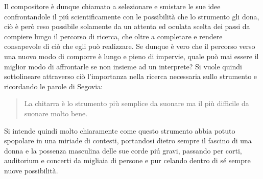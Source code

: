 \documentclass[oneside]{article}
\begin{document}
\begin{multicols*}{2}
Il compositore è dunque chiamato a selezionare e smistare le sue idee confrontandole il piú scientificamente con le possibilità che lo strumento gli dona, ciò è però reso possibile solamente da un attenta ed oculata scelta dei passi da compiere lungo il percorso di ricerca, che oltre a completare e rendere consapevole di ciò che egli può realizzare. Se dunque è vero che il percorso verso una nuovo modo di comporre è lungo e pieno di impervie, quale può mai essere il miglior modo di affrontarle se non insieme ad un interprete? Si vuole quindi sottolineare attraverso ciò l'importanza nella ricerca necessaria sullo strumento e ricordando le parole di Segovia: \begin{quote} La chitarra è lo strumento più semplice da suonare ma il più difficile da suonare molto bene. \end{quote} Si intende quindi molto chiaramente come questo strumento abbia potuto spopolare in una miriade di contesti, portandosi dietro sempre il fascino di una donna e la possenza masculina delle sue corde piú gravi, passando per corti, auditorium e concerti da migliaia di persone e pur celando  dentro di sé sempre nuove possibilità. 


\newpage



\end{multicols*}
\end{document}
